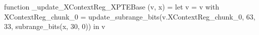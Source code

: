function _update_XContextReg_XPTEBase (v, x) = let v = { v with XContextReg_chunk_0 = update_subrange_bits(v.XContextReg_chunk_0, 63, 33, subrange_bits(x, 30, 0)) } in
  v
